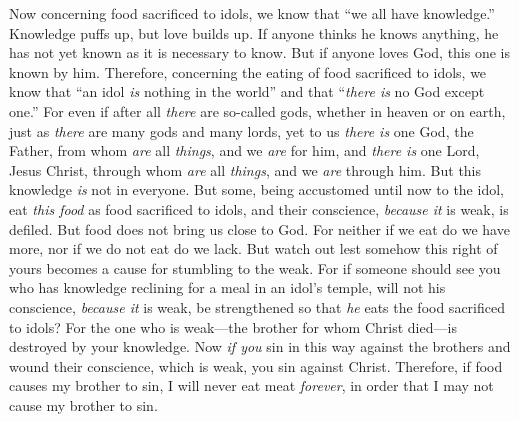 \begin{biblechapter} %
 Now concerning food sacrificed to idols, we know that “we all have knowledge.” Knowledge puffs up, but love builds up.
\verse If anyone thinks he knows anything, he has not yet known as it is necessary to know.
\verse But if anyone loves God, this one is known by him.
\verse Therefore, concerning the eating of food sacrificed to idols, we know that “an idol \textit{is} nothing in the world” and that “\textit{there is} no God except one.”
\verse For even if after all \textit{there} are so-called gods, whether in heaven or on earth, just as \textit{there} are many gods and many lords,
\verse yet to us \textit{there is} one God, the Father, 
from whom \textit{are} all \textit{things}, and we \textit{are} for him, 
and \textit{there is} one Lord, Jesus Christ, 
through whom \textit{are} all \textit{things}, and we \textit{are} through him.
\verse But this knowledge \textit{is} not in everyone. But some, being accustomed until now to the idol, eat \textit{this food} as food sacrificed to idols, and their conscience, \textit{because it} is weak, is defiled.
\verse But food does not bring us close to God. For neither if we eat do we have more, nor if we do not eat do we lack.
\verse But watch out lest somehow this right of yours becomes a cause for stumbling to the weak.
\verse For if someone should see you who has knowledge reclining for a meal in an idol’s temple, will not his conscience, \textit{because it} is weak, be strengthened so that \textit{he} eats the food sacrificed to idols?
\verse For the one who is weak—the brother for whom Christ died—is destroyed by your knowledge.
\verse Now \textit{if you} sin in this way against the brothers and wound their conscience, which is weak, you sin against Christ.
\verse Therefore, if food causes my brother to sin, I will never eat meat \textit{forever}, in order that I may not cause my brother to sin.
\end{biblechapter}

